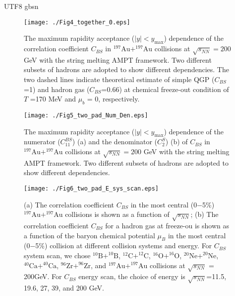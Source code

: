 \documentclass[twocolumn,showpacs,preprintnumbers,amsmath,amssymb]{revtex4-1}
\begin{document}
\begin{CJK*} {UTF8} {gbsn}
	


\par

		
	\begin{figure}[htb]
				\texttt{[image: ./Fig4\_together\_0.eps]}
				\caption{
				The maximum rapidity acceptance ($|y|<y_{\text{max}}$) dependence of the correlation coefficient $C_{BS}$
				in $\mathrm{^{197}Au+^{197}Au}$ collisions at $\sqrt{s_{NN}} = 200$ GeV with the string melting AMPT framework.
				Two different subsets of hadrons are adopted to show different dependencies.
				The two dashed lines indicate theoretical estimate of simple QGP ($C_{BS}$=1) and hadron gas ($C_{BS}$=0.66) at chemical freeze-out condition of $T$ =170 MeV and $\mu_{b}$ = 0, respectively.  }
				\label{Fig4_ymax}
	\end{figure}
	
				\begin{figure}[htb]
				\texttt{[image: ./Fig5\_two\_pad\_Num\_Den.eps]}
				\caption{
				The maximum rapidity acceptance ($|y|<y_{\text{max}}$) dependence of the numerator ($C_{11}^{BS}$) (a) and the denominator ($C_{2}^{S}$) (b) of $C_{BS}$
				in $\mathrm{^{197}Au+^{197}Au}$ collisions at $\sqrt{s_{NN}} = 200$ GeV with the string melting AMPT framework.
				Two different subsets of hadrons are adopted to show different dependencies.
				}
				\label{Fig5_Num_Den}
	\end{figure}
	
		\begin{figure}[htb]
				\texttt{[image: ./Fig6\_two\_pad\_E\_sys\_scan.eps]}
				\caption{
				{\color{blue}(a)} The correlation coefficient $C_{BS}$ in the most central (0$-$5\%) $\mathrm{^{197}Au+^{197}Au}$ collisions is shown as a function of $\sqrt{s_{NN}}$; 
				{\color{blue}(b)} The correlation coefficient $C_{BS}$ for a hadron gas at freeze-ou is shown as a function of the baryon chemical potential $\mu_{B}$ in the most central (0$-$5\%) collision at different collision systems and energy.
				For $C_{BS}$ system scan, we chose
				 $\mathrm{^{10}B+^{10}B}$, $\mathrm{^{12}C+^{12}C}$, $\mathrm{^{16}O+^{16}O}$, $\mathrm{^{20}Ne+^{20}Ne}$, $\mathrm{^{40}Ca+^{40}Ca}$, $\mathrm{^{96}Zr+^{96}Zr}$, and $\mathrm{^{197}Au+^{197}Au}$ collisions at $\sqrt{s_{NN}}$ = 200GeV.
				 For $C_{BS}$ energy scan, the choice of energy is $\sqrt{s_{NN}}$=11.5, 19.6, 27, 39, and 200 GeV.
				}
				\label{Fig6_E_sys_mub}
	\end{figure}
		

\end{CJK*}
\end{document}
